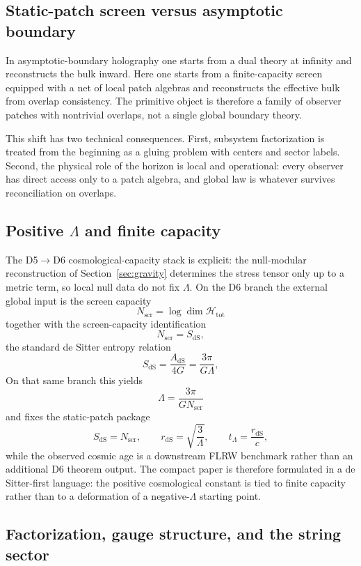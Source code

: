\documentclass[11pt]{article}
\begin{document}
\subsection{Static-patch screen versus asymptotic boundary}

In asymptotic-boundary holography one starts from a dual theory at infinity and reconstructs the bulk inward. Here one starts from a finite-capacity screen equipped with a net of local patch algebras and reconstructs the effective bulk from overlap consistency. The primitive object is therefore a family of observer patches with nontrivial overlaps, not a single global boundary theory.

This shift has two technical consequences. First, subsystem factorization is treated from the beginning as a gluing problem with centers and sector labels. Second, the physical role of the horizon is local and operational: every observer has direct access only to a patch algebra, and global law is whatever survives reconciliation on overlaps.

\subsection{Positive $\Lambda$ and finite capacity}

The D5\(\to\)D6 cosmological-capacity stack is explicit: the null-modular reconstruction of Section~\ref{sec:gravity} determines the stress tensor only up to a metric term, so local null data do not fix $\Lambda$. On the D6 branch the external global input is the screen capacity
\[
N_{\mathrm{scr}}=\log\dim\mathcal H_{\mathrm{tot}}
\]
together with the screen-capacity identification
\[
N_{\mathrm{scr}}=S_{\mathrm{dS}},
\]
\noindent the standard de Sitter entropy relation
\[
S_{\mathrm{dS}}=\frac{A_{\mathrm{dS}}}{4G}=\frac{3\pi}{G\Lambda},
\]
On that same branch this yields
\[
\Lambda=\frac{3\pi}{G N_{\mathrm{scr}}}
\]
and fixes the static-patch package
\[
S_{\mathrm{dS}}=N_{\mathrm{scr}},
\qquad
r_{\mathrm{dS}}=\sqrt{\frac{3}{\Lambda}},
\qquad
t_\Lambda=\frac{r_{\mathrm{dS}}}{c},
\]
while the observed cosmic age is a downstream FLRW benchmark rather than an additional D6 theorem output. The compact paper is therefore formulated in a de Sitter-first language: the positive cosmological constant is tied to finite capacity rather than to a deformation of a negative-$\Lambda$ starting point.

\subsection{Factorization, gauge structure, and the string sector}
\end{document}
